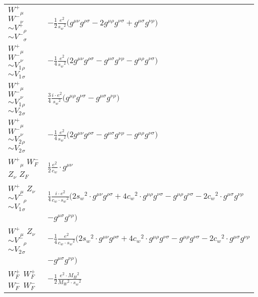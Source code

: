 \begin{center}
\begin{tabular}{|l|l|}
$W^+{}_{\mu }$ \phantom{-} $W^-{}_{\nu }$ \phantom{-} $\sim V^+{}_{\rho }$ \phantom{-} $\sim V^-{}_{\sigma }$ \phantom{-}  &
	$-\frac{1}{2}\frac{ e{}^2 }{ s_w{}^2 }\big(g^{\mu \nu} g^{\rho \sigma} -2g^{\mu \rho} g^{\nu \sigma} +g^{\mu \sigma} g^{\nu \rho} \big)$\\[2mm]
$W^+{}_{\mu }$ \phantom{-} $W^-{}_{\nu }$ \phantom{-} $\sim V_1{}_{\rho }$ \phantom{-} $\sim V_1{}_{\sigma }$ \phantom{-}  &
	$-\frac{1}{4}\frac{ e{}^2 }{ s_w{}^2 }\big(2g^{\mu \nu} g^{\rho \sigma} -g^{\mu \sigma} g^{\nu \rho} -g^{\mu \rho} g^{\nu \sigma} \big)$\\[2mm]
$W^+{}_{\mu }$ \phantom{-} $W^-{}_{\nu }$ \phantom{-} $\sim V_1{}_{\rho }$ \phantom{-} $\sim V_2{}_{\sigma }$ \phantom{-}  &
	$\frac{3}{4}\frac{ i \cdot e{}^2 }{ s_w{}^2 }\big(g^{\mu \rho} g^{\nu \sigma} -g^{\mu \sigma} g^{\nu \rho} \big)$\\[2mm]
$W^+{}_{\mu }$ \phantom{-} $W^-{}_{\nu }$ \phantom{-} $\sim V_2{}_{\rho }$ \phantom{-} $\sim V_2{}_{\sigma }$ \phantom{-}  &
	$-\frac{1}{4}\frac{ e{}^2 }{ s_w{}^2 }\big(2g^{\mu \nu} g^{\rho \sigma} -g^{\mu \sigma} g^{\nu \rho} -g^{\mu \rho} g^{\nu \sigma} \big)$\\[2mm]
$W^+{}_{\mu }$ \phantom{-} $W^-_F{}_{}$ \phantom{-} ${Z}_{\nu }$ \phantom{-} $Z_F{}_{}$ \phantom{-}  &
	$\frac{1}{2}\frac{ e{}^2 }{ c_w}\cdot g^{\mu \nu} $\\[2mm]
$W^+{}_{\mu }$ \phantom{-} ${Z}_{\nu }$ \phantom{-} $\sim V^-{}_{\rho }$ \phantom{-} $\sim V_1{}_{\sigma }$ \phantom{-}  &
	$\frac{1}{4}\frac{ i \cdot e{}^2 }{ c_w \cdot s_w{}^2 }\big(2 s_w{}^2 \cdot g^{\mu \nu} g^{\rho \sigma} +4 c_w{}^2 \cdot g^{\mu \rho} g^{\nu \sigma} -g^{\mu \rho} g^{\nu \sigma} -2 c_w{}^2 \cdot g^{\mu \sigma} g^{\nu \rho} $ \\[2mm]
  & $-g^{\mu \sigma} g^{\nu \rho} \big)$\\[2mm]
$W^+{}_{\mu }$ \phantom{-} ${Z}_{\nu }$ \phantom{-} $\sim V^-{}_{\rho }$ \phantom{-} $\sim V_2{}_{\sigma }$ \phantom{-}  &
	$-\frac{1}{4}\frac{ e{}^2 }{ c_w \cdot s_w{}^2 }\big(2 s_w{}^2 \cdot g^{\mu \nu} g^{\rho \sigma} +4 c_w{}^2 \cdot g^{\mu \rho} g^{\nu \sigma} -g^{\mu \rho} g^{\nu \sigma} -2 c_w{}^2 \cdot g^{\mu \sigma} g^{\nu \rho} $ \\[2mm]
  & $-g^{\mu \sigma} g^{\nu \rho} \big)$\\[2mm]
$W^+_F{}_{}$ \phantom{-} $W^+_F{}_{}$ \phantom{-} $W^-_F{}_{}$ \phantom{-} $W^-_F{}_{}$ \phantom{-}  &
	$-\frac{1}{2}\frac{ e{}^2  \cdot M_H{}^2 }{ M_W{}^2  \cdot s_w{}^2 }$\\[2mm]

\end{tabular}
\end{center}
